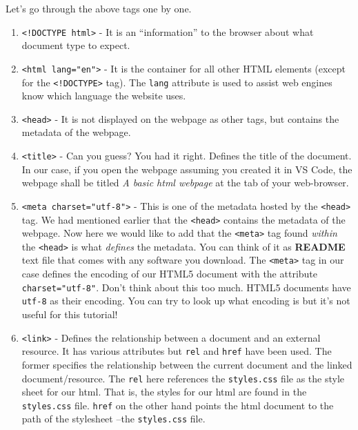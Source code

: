 \documentclass[
]{book}
\begin{document}
Let's go through the above tags one by one.

\begin{enumerate}
\def\labelenumi{\arabic{enumi}.}
\item
  \texttt{\textless{}!DOCTYPE\ html\textgreater{}} - It is an ``information'' to the browser about what document type to expect.
\item
  \texttt{\textless{}html\ lang="en"\textgreater{}} - It is the container for all other HTML elements (except for the \texttt{\textless{}!DOCTYPE\textgreater{}} tag). The \texttt{lang} attribute is used to assist web engines know which language the website uses.
\item
  \texttt{\textless{}head\textgreater{}} - It is not displayed on the webpage as other tags, but contains the metadata of the webpage.
\item
  \texttt{\textless{}title\textgreater{}} - Can you guess? You had it right. Defines the title of the document. In our case, if you open the webpage assuming you created it in VS Code, the webpage shall be titled \emph{A basic html webpage} at the tab of your web-browser.
\item
  \texttt{\textless{}meta\ charset="utf-8"\textgreater{}} - This is one of the metadata hosted by the \texttt{\textless{}head\textgreater{}} tag. We had mentioned earlier that the \texttt{\textless{}head\textgreater{}} contains the metadata of the webpage. Now here we would like to add that the \texttt{\textless{}meta\textgreater{}} tag found \emph{within} the \texttt{\textless{}head\textgreater{}} is what \emph{defines} the metadata. You can think of it as \textbf{README} text file that comes with any software you download. The \texttt{\textless{}meta\textgreater{}} tag in our case defines the encoding of our HTML5 document with the attribute \texttt{charset="utf-8"}. Don't think about this too much. HTML5 documents have \texttt{utf-8} as their encoding. You can try to look up what encoding is but it's not useful for this tutorial!
\item
  \texttt{\textless{}link\textgreater{}} - Defines the relationship between a document and an external resource. It has various attributes but \texttt{rel} and \texttt{href} have been used. The former specifies the relationship between the current document and the linked document/resource. The \texttt{rel} here references the \texttt{styles.css} file as the style sheet for our html. That is, the styles for our html are found in the \texttt{styles.css} file. \texttt{href} on the other hand points the html document to the path of the stylesheet --the \texttt{styles.css} file.

\end{enumerate}
\end{document}
